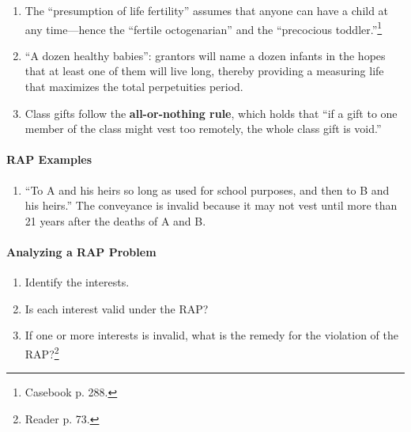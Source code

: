 \begin{enumerate}
\begin{enumerate}
        plus 21 years. Since you can prove that the interest must vest within 
        this period, the remainder is valid.\footnote{Casebook pp. 286--87.}
        \item Invalid: O transfers land ``in trust to A for life, then to A's 
        first child to reach 25.'' The interest will not necessarily vest 
        before after A's life plus 21 years. Thus, the remainder is invalid.
        \item Invalid: to A and his heirs so long as used for school purposes, 
        and then to B and his heirs. The interest will not necessarily vest or 
        terminate within A or B's lifetimes.
    \end{enumerate}
    \item The ``presumption of life fertility'' assumes that anyone can have a 
    child at any time---hence the ``fertile octogenarian'' and the 
    ``precocious toddler.''\footnote{Casebook p. 288.}
    \item ``A dozen healthy babies'': grantors will name a dozen infants in 
    the hopes that at least one of them will live long, thereby providing a 
    measuring life that maximizes the total perpetuities period.
    \item Class gifts follow the \textbf{all-or-nothing rule}, which holds 
    that ``if a gift to one member of the class might vest too remotely, the 
    whole class gift is void.'' %
\end{enumerate}

\paragraph{RAP Examples}

\begin{enumerate}
    \item ``To A and his heirs so long as used for school purposes, and then 
    to B and his heirs.'' The conveyance is invalid because it may not vest 
    until more than 21 years after the deaths of A and B.
\end{enumerate}

\paragraph{Analyzing a RAP Problem}

\begin{enumerate}
    \item Identify the interests.
    \item Is each interest valid under the RAP?
    \item If one or more interests is invalid, what is the remedy for the 
    violation of the RAP?\footnote{Reader p. 73.}
\end{enumerate}

